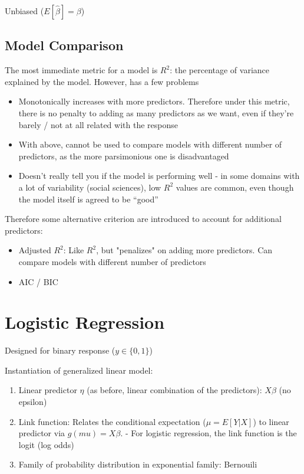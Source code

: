 \documentclass{article}
\begin{document}
Unbiased ($E[\hat{\beta}] = \beta$)

\subsection{Model Comparison}

The most immediate metric for a model is $R^2$: the percentage of variance explained by the model. However, has a few problems

\begin{itemize}
	\item Monotonically increases with more predictors. Therefore under this metric, there is no penalty to adding as many predictors as we want, even if they're barely / not at all related with the response
	\item With above, cannot be used to compare models with different number of predictors, as the more parsimonious one is disadvantaged
	\item Doesn't really tell you if the model is performing well - in some domains with a lot of variability (social sciences), low $R^2$ values are common, even though the model itself is agreed to be ``good''
\end{itemize}
	
Therefore some alternative criterion are introduced to account for additional predictors:

\begin{itemize}
	\item Adjusted $R^2$: Like $R^2$, but "penalizes" on adding more predictors. Can compare models with different number of predictors
	\item AIC / BIC
\end{itemize}

\section{Logistic Regression}


Designed for binary response ($y \in  \{0, 1\}$)

Instantiation of generalized linear model:
\begin{enumerate}
	\item Linear predictor $\eta$ (as before, linear combination of the predictors): $X\beta$ (no epsilon)
	\item Link function: Relates the conditional expectation ($\mu = E[Y|X]$) to linear predictor via $g(mu) = X\beta$.
		- For logistic regression, the link function is the logit (log odds)
	\item Family of probability distribution in exponential family: Bernouili
\end{enumerate}
\end{document}
